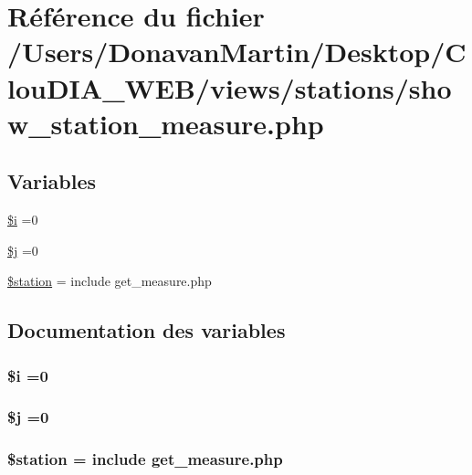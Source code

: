 \hypertarget{show__station__measure_8php}{}\section{Référence du fichier /\+Users/\+Donavan\+Martin/\+Desktop/\+Clou\+D\+I\+A\+\_\+\+W\+E\+B/views/stations/show\+\_\+station\+\_\+measure.php}
\label{show__station__measure_8php}
\subsection*{Variables}
\begin{DoxyCompactItemize}
\item 
\hyperlink{show__station__measure_8php_a83018d9153d17d91fbcf3bc10158d34f}{\$i} =0
\item 
\hyperlink{show__station__measure_8php_a6f16db779ef3ccea921b277b5dc245d1}{\$j} =0
\item 
\hyperlink{show__station__measure_8php_a9ec82d517a99b9eb857490f8e6e5ecc2}{\$station} = include \textquotesingle{}get\+\_\+measure.\+php\textquotesingle{}
\end{DoxyCompactItemize}


\subsection{Documentation des variables}
\hypertarget{show__station__measure_8php_a83018d9153d17d91fbcf3bc10158d34f}{}
\subsubsection[{\$i}]{\setlength{\rightskip}{0pt plus 5cm}\$i =0}\label{show__station__measure_8php_a83018d9153d17d91fbcf3bc10158d34f}
\hypertarget{show__station__measure_8php_a6f16db779ef3ccea921b277b5dc245d1}{}
\subsubsection[{\$j}]{\setlength{\rightskip}{0pt plus 5cm}\$j =0}\label{show__station__measure_8php_a6f16db779ef3ccea921b277b5dc245d1}
\hypertarget{show__station__measure_8php_a9ec82d517a99b9eb857490f8e6e5ecc2}{}
\subsubsection[{\$station}]{\setlength{\rightskip}{0pt plus 5cm}\$station = include \textquotesingle{}get\+\_\+measure.\+php\textquotesingle{}}\label{show__station__measure_8php_a9ec82d517a99b9eb857490f8e6e5ecc2}

